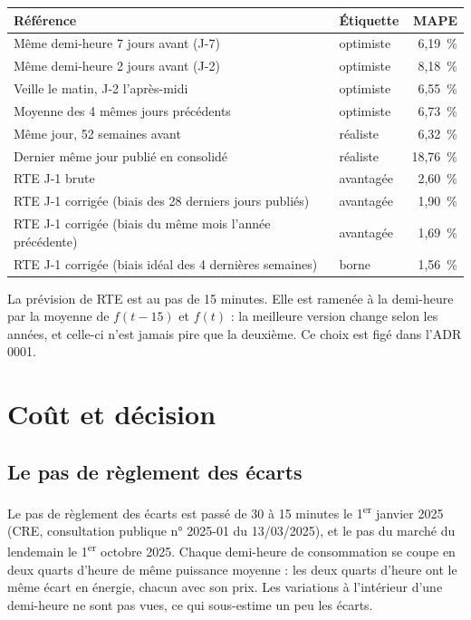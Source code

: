 \documentclass[11pt,a4paper]{article}
\begin{document}
\begin{table}[H]
\small
\begin{tabularx}{\linewidth}{Ylr}
\toprule
\textbf{Référence} & \textbf{Étiquette} & \textbf{MAPE} \\
\midrule
Même demi-heure 7 jours avant (J-7) & optimiste & 6,19~\% \\
Même demi-heure 2 jours avant (J-2) & optimiste & 8,18~\% \\
Veille le matin, J-2 l'après-midi & optimiste & 6,55~\% \\
Moyenne des 4 mêmes jours précédents & optimiste & 6,73~\% \\
Même jour, 52 semaines avant & réaliste & 6,32~\% \\
Dernier même jour publié en consolidé & réaliste & 18,76~\% \\
RTE J-1 brute & avantagée & 2,60~\% \\
RTE J-1 corrigée (biais des 28 derniers jours publiés) & avantagée & 1,90~\% \\
RTE J-1 corrigée (biais du même mois l'année précédente) & avantagée & 1,69~\% \\
RTE J-1 corrigée (biais idéal des 4 dernières semaines) & borne & 1,56~\% \\
\bottomrule
\end{tabularx}
\end{table}

La prévision de RTE est au pas de 15 minutes. Elle est ramenée à la demi-heure par la moyenne de $f(t-15)$ et $f(t)$ : la meilleure version change selon les années, et celle-ci n'est jamais pire que la deuxième. Ce choix est figé dans l'ADR 0001.


\section{Coût et décision}

\subsection{Le pas de règlement des écarts}

Le pas de règlement des écarts est passé de 30 à 15 minutes le 1\textsuperscript{er} janvier 2025 (CRE, consultation publique n° 2025-01 du 13/03/2025), et le pas du marché du lendemain le 1\textsuperscript{er} octobre 2025. Chaque demi-heure de consommation se coupe en deux quarts d'heure de même puissance moyenne : les deux quarts d'heure ont le même écart en énergie, chacun avec son prix. Les variations à l'intérieur d'une demi-heure ne sont pas vues, ce qui sous-estime un peu les écarts.
\end{document}
